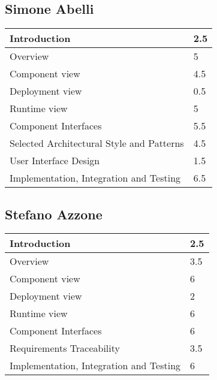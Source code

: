 
\subsection{Simone Abelli}
\begin{tabular} { | m{5cm} | m{1cm} | }
	\hline
	Introduction & 2.5\\
	\hline
	Overview & 5\\
	\hline
	Component view & 4.5\\
	\hline
	Deployment view & 0.5\\
	\hline
	Runtime view & 5\\
	\hline
	Component Interfaces & 5.5\\
	\hline
	Selected Architectural Style and Patterns & 4.5\\
	\hline
	User Interface Design & 1.5\\
	\hline
	Implementation, Integration and Testing & 6.5\\
	\hline
\end{tabular}

\subsection{Stefano Azzone}
\begin{tabular} { | m{5cm} | m{1cm} | }
	\hline
	Introduction & 2.5\\
	\hline
	Overview & 3.5\\
	\hline
	Component view & 6\\
	\hline
	Deployment view & 2\\
	\hline
	Runtime view & 6\\
	\hline
	Component Interfaces & 6\\
	\hline
	Requirements Traceability & 3.5\\
	\hline
	Implementation, Integration and Testing & 6\\
	\hline
\end{tabular}